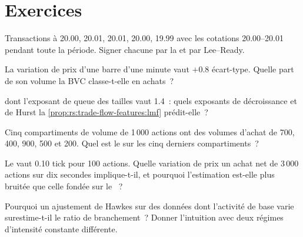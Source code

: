 \section{Exercices}

\begin{exercise}[$\star$]\label{exo:rs:trade-flow-features:1}
Transactions à 20.00, 20.01, 20.01, 20.00, 19.99 avec les cotations 20.00--20.01 pendant toute la période. Signer chacune par la  et par Lee--Ready.
\end{exercise}

\begin{exercise}[$\star$]\label{exo:rs:trade-flow-features:2}
La variation de prix d'une barre d'une minute vaut $+0.8$ écart-type. Quelle part de son volume la BVC classe-t-elle en achats~?
\end{exercise}

\begin{exercise}[$\star$]\label{exo:rs:trade-flow-features:3}
 dont l'exposant de queue des tailles vaut 1.4~: quels exposants de décroissance et de Hurst la \cref{prop:rs:trade-flow-features:lmf} prédit-elle~?
\end{exercise}

\begin{exercise}[$\star\star$]\label{exo:rs:trade-flow-features:4}
Cinq compartiments de volume de 1\,000 actions ont des volumes d'achat de 700, 400, 900, 500 et 200. Quel est le  sur les cinq derniers compartiments~?
\end{exercise}

\begin{exercise}[$\star\star$]\label{exo:rs:trade-flow-features:5}
Le  vaut 0.10 tick pour 100 actions. Quelle variation de prix un achat net de 3\,000 actions sur dix secondes implique-t-il, et pourquoi
l'estimation est-elle plus bruitée que celle fondée sur le ~?
\end{exercise}

\begin{exercise}[$\star\star$]\label{exo:rs:trade-flow-features:6}
Pourquoi un ajustement de Hawkes sur des données dont l'activité de base varie surestime-t-il le ratio de branchement~? Donner l'intuition avec deux régimes
d'intensité constante différente.
\end{exercise}

